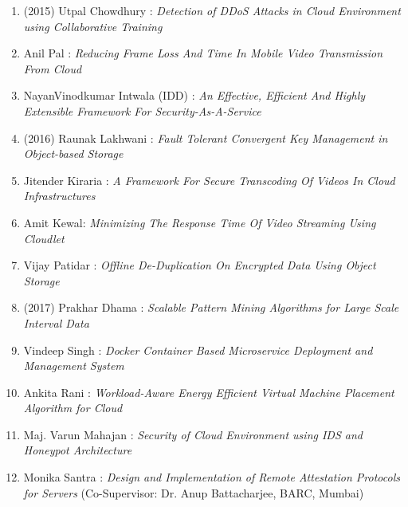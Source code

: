 \begin{enumerate}

\item	(2015) Utpal Chowdhury : 	\textit{	Detection of DDoS Attacks in Cloud Environment using Collaborative Training}
\item		Anil Pal : 	\textit{	Reducing Frame Loss And Time In Mobile Video Transmission From Cloud}	
\item		NayanVinodkumar Intwala (IDD) : 	\textit{	An Effective, Efficient And Highly Extensible Framework For Security-As-A-Service}	


\item	(2016) Raunak Lakhwani : 	\textit{Fault Tolerant Convergent Key Management in Object-based Storage}
\item		Jitender Kiraria : 	\textit{	A Framework For Secure Transcoding Of Videos In Cloud Infrastructures}
\item		Amit Kewal: 	\textit{	Minimizing The Response Time Of Video Streaming Using Cloudlet}
\item		Vijay Patidar : 	\textit{	Offline De-Duplication On Encrypted Data Using Object Storage}	


\item	(2017) Prakhar Dhama : 	\textit{	Scalable Pattern Mining Algorithms for Large Scale Interval Data}
\item		Vindeep Singh : 	\textit{	Docker Container Based Microservice Deployment and Management System}	
\item		Ankita Rani : 	\textit{	Workload-Aware Energy Efficient Virtual Machine Placement Algorithm for Cloud}	
\item		Maj. Varun Mahajan : 	\textit{	Security of Cloud Environment using IDS and Honeypot Architecture}
\item		Monika Santra : 	\textit{	Design and Implementation of Remote Attestation Protocols for Servers} (Co-Supervisor:	Dr. Anup Battacharjee, BARC, Mumbai)



\end{enumerate}
